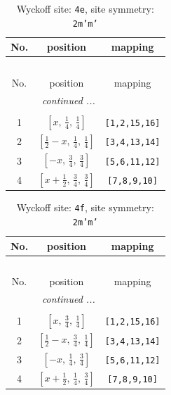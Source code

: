 \documentclass[fleqn,8pt]{jsarticle}
\begin{document}
\begin{longtable}{ccc}
\caption{Wyckoff site: {\tt 4e}, site symmetry: {\tt 2m'm'}}
 \\
 \hline \hline
No. & position & mapping \\ \hline \endfirsthead

\multicolumn{2}{l}{\tablename\ \thetable{}} \\
 \hline \hline
No. & position & mapping \\ \hline \endhead

 \hline \hline
\multicolumn{2}{r}{\footnotesize\it continued ...} \\ \endfoot

 \hline \hline
\multicolumn{2}{r}{} \\ \endlastfoot

1 & $\left[ x,\, \frac{1}{4},\, \frac{1}{4} \right]$ & {\tt [1,2,15,16]} \\ \hline
2 & $\left[ \frac{1}{2} - x,\, \frac{1}{4},\, \frac{1}{4} \right]$ & {\tt [3,4,13,14]} \\ \hline
3 & $\left[ - x,\, \frac{3}{4},\, \frac{3}{4} \right]$ & {\tt [5,6,11,12]} \\ \hline
4 & $\left[ x + \frac{1}{2},\, \frac{3}{4},\, \frac{3}{4} \right]$ & {\tt [7,8,9,10]} \\
\end{longtable}
\renewcommand{\arraystretch}{1.2}
\begin{longtable}{ccc}
\caption{Wyckoff site: {\tt 4f}, site symmetry: {\tt 2m'm'}}
 \\
 \hline \hline
No. & position & mapping \\ \hline \endfirsthead

\multicolumn{2}{l}{\tablename\ \thetable{}} \\
 \hline \hline
No. & position & mapping \\ \hline \endhead

 \hline \hline
\multicolumn{2}{r}{\footnotesize\it continued ...} \\ \endfoot

 \hline \hline
\multicolumn{2}{r}{} \\ \endlastfoot

1 & $\left[ x,\, \frac{3}{4},\, \frac{1}{4} \right]$ & {\tt [1,2,15,16]} \\ \hline
2 & $\left[ \frac{1}{2} - x,\, \frac{3}{4},\, \frac{1}{4} \right]$ & {\tt [3,4,13,14]} \\ \hline
3 & $\left[ - x,\, \frac{1}{4},\, \frac{3}{4} \right]$ & {\tt [5,6,11,12]} \\ \hline
4 & $\left[ x + \frac{1}{2},\, \frac{1}{4},\, \frac{3}{4} \right]$ & {\tt [7,8,9,10]} \\
\end{longtable}
\end{document}
